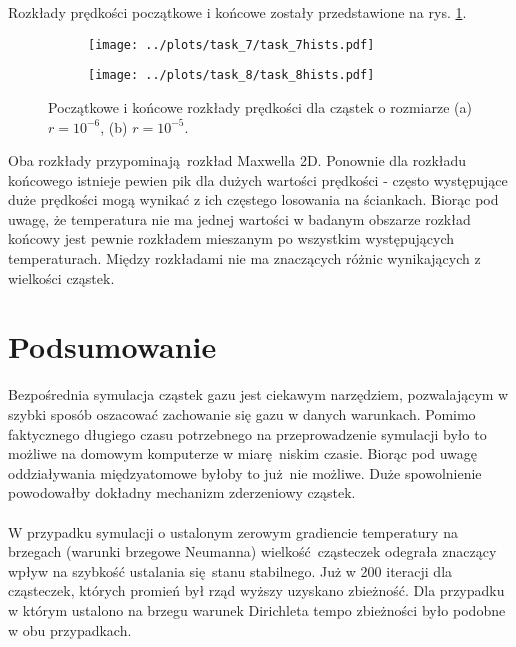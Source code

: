 \documentclass[a4paper, 12pt]{article}
\begin{document}
	\noindent Rozkłady prędkości początkowe i końcowe zostały przedstawione na rys. \ref{hist_task_78}.
	
		\begin{figure}[H]
		\centering
		\begin{subfigure}{0.49\textwidth}
			\centering
			\texttt{[image: ../plots/task\_7/task\_7hists.pdf]}
			\caption{}
		\end{subfigure}
		\begin{subfigure}{0.49\textwidth}
			\centering
			\texttt{[image: ../plots/task\_8/task\_8hists.pdf]}
			\caption{}
		\end{subfigure}
		\caption{Początkowe i końcowe rozkłady prędkości dla cząstek o rozmiarze (a) $r = 10^{-6}$, (b) $r = 10^{-5}$.}
		\label{hist_task_78}
	\end{figure}
	
	\noindent Oba rozkłady przypominają rozkład Maxwella 2D. 
	Ponownie dla rozkładu końcowego istnieje pewien pik dla dużych wartości prędkości - często występujące duże prędkości mogą wynikać z ich częstego losowania na ściankach.
	Biorąc pod uwagę, że temperatura nie ma jednej wartości w badanym obszarze rozkład końcowy jest pewnie rozkładem mieszanym po wszystkim występujących temperaturach.
	Między rozkładami nie ma znaczących różnic wynikających z wielkości cząstek.
	
	\section*{Podsumowanie}
	
	Bezpośrednia symulacja cząstek gazu jest ciekawym narzędziem, pozwalającym w szybki sposób oszacować zachowanie się gazu w danych warunkach.
	Pomimo faktycznego długiego czasu potrzebnego na przeprowadzenie symulacji było to możliwe na domowym komputerze w miarę niskim czasie. 
	Biorąc pod uwagę oddziaływania międzyatomowe byłoby to już nie możliwe.
	Duże spowolnienie powodowałby dokładny mechanizm zderzeniowy cząstek. 
	\\
	\\
	W przypadku symulacji o ustalonym zerowym gradiencie temperatury na brzegach (warunki brzegowe Neumanna) wielkość cząsteczek odegrała znaczący wpływ na szybkość ustalania się stanu stabilnego. 
	Już w 200 iteracji dla cząsteczek, których promień był rząd wyższy uzyskano zbieżność. 
	Dla przypadku w którym ustalono na brzegu warunek Dirichleta tempo zbieżności było podobne w obu przypadkach.
	
	
\end{document}
